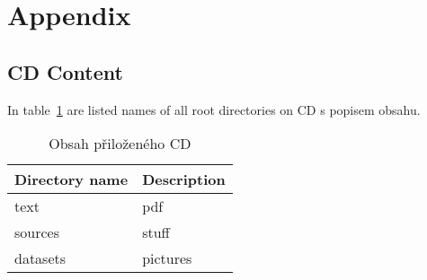 \section*{Appendix}
\subsection*{CD Content}

In table~\ref{tab:obsah} are listed names of all root directories on CD s popisem obsahu.

\vspace{1cm}
\begin{table}[!htb]
\centering
\begin{tabular}{lp{10cm}}
\textbf{Directory name} & \textbf{Description} \\

\hline
text & pdf\\
sources & stuff\\
datasets & pictures\\
\hline
\end{tabular}
\caption{Obsah přiloženého CD}
\label{tab:obsah}
\end{table}

\newpage{}
